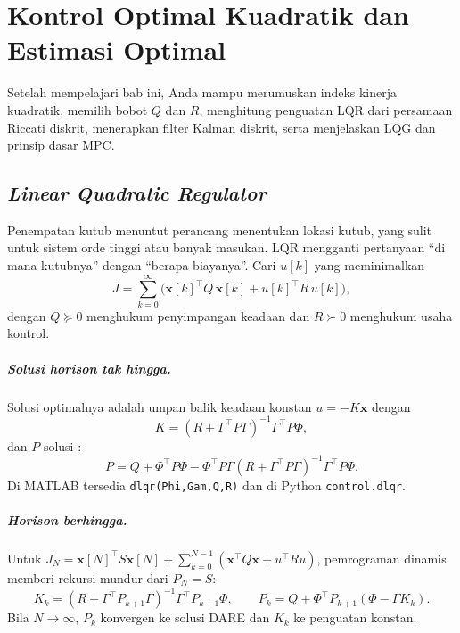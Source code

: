 \chapter{Kontrol Optimal Kuadratik dan Estimasi Optimal}
\label{bab:lqr}

\begin{tujuan}
	Setelah mempelajari bab ini, Anda mampu merumuskan indeks kinerja kuadratik, memilih bobot $Q$ dan $R$, menghitung penguatan LQR dari persamaan Riccati diskrit, menerapkan filter Kalman diskrit, serta menjelaskan LQG dan prinsip dasar MPC.
\end{tujuan}

\section{\textit{Linear Quadratic Regulator}}
Penempatan kutub menuntut perancang menentukan lokasi kutub, yang sulit untuk sistem orde tinggi atau banyak masukan. LQR mengganti pertanyaan ``di mana kutubnya'' dengan ``berapa biayanya''. Cari $u[k]$ yang meminimalkan
\begin{equation}
	J = \sum_{k=0}^{\infty}\Big(\mathbf{x}[k]^\top Q\,\mathbf{x}[k] + u[k]^\top R\,u[k]\Big),
\end{equation}
dengan $Q \succeq 0$ menghukum penyimpangan keadaan dan $R \succ 0$ menghukum usaha kontrol.

\paragraph{Solusi horison tak hingga.} Solusi optimalnya adalah umpan balik keadaan konstan $u = -K\mathbf{x}$ dengan
\begin{equation}
	K = (R + \Gamma^\top P\Gamma)^{-1}\Gamma^\top P\Phi,
\end{equation}
dan $P$ solusi :
\begin{equation}
	P = Q + \Phi^\top P\Phi - \Phi^\top P\Gamma(R + \Gamma^\top P\Gamma)^{-1}\Gamma^\top P\Phi.
\end{equation}
Di MATLAB tersedia \texttt{dlqr(Phi,Gam,Q,R)} dan di Python \texttt{control.dlqr}.

\paragraph{Horison berhingga.} Untuk $J_N = \mathbf{x}[N]^\top S\mathbf{x}[N] + \sum_{k=0}^{N-1}(\mathbf{x}^\top Q\mathbf{x} + u^\top Ru)$, pemrograman dinamis memberi rekursi mundur dari $P_N = S$:
\begin{equation}
	K_k = (R + \Gamma^\top P_{k+1}\Gamma)^{-1}\Gamma^\top P_{k+1}\Phi,\qquad P_k = Q + \Phi^\top P_{k+1}(\Phi - \Gamma K_k).
\end{equation}
Bila $N \to \infty$, $P_k$ konvergen ke solusi DARE dan $K_k$ ke penguatan konstan.

